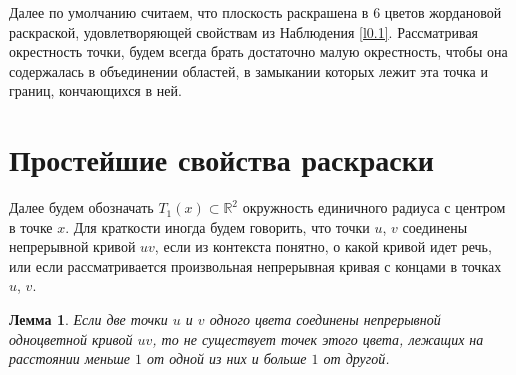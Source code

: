 \documentclass[12pt,a4paper]{article}
\newtheorem{lemma}{Лемма}
\renewcommand{\qed}{$\blacksquare \vspace{5mm}$}
\begin{document}


Далее по умолчанию считаем, что плоскость раскрашена в $6$ цветов жордановой раскраской, удовлетворяющей свойствам из Наблюдения \ref{l0.1}. Рассматривая окрестность точки, будем всегда брать достаточно малую окрестность, чтобы она содержалась в объединении областей, в замыкании которых лежит эта точка и границ, кончающихся в ней.

\section{Простейшие свойства раскраски}

Далее будем обозначать $T_1(x) \subset \mathbb{R}^2$ окружность единичного радиуса с центром в точке $x$. Для краткости иногда будем говорить, что точки $u$, $v$ соединены непрерывной кривой $uv$, если из контекста понятно, о какой кривой идет речь, или если рассматривается произвольная непрерывная кривая с концами в точках $u$, $v$.

\begin{lemma} \label{l1.1}
	Если две точки $u$ и $v$ одного цвета соединены непрерывной одноцветной кривой $uv$, то не существует точек этого цвета, лежащих на расстоянии меньше $1$ от одной из них и больше $1$ от другой.
\end{lemma}
\end{document}
